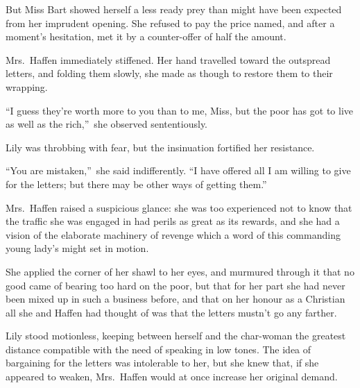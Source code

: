 \documentclass[12pt,a4paper]{book}
\begin{document}
But Miss Bart showed herself a less ready prey than might have
been expected from her imprudent opening. She refused to pay the
price named, and after a moment's hesitation, met it by a
counter-offer of half the amount.





Mrs.\ Haffen immediately stiffened. Her hand travelled toward the
outspread letters, and folding them slowly, she made as though to
restore them to their wrapping.





``I guess they're worth more to you than to me, Miss, but the poor
has got to live as well as the rich,''\ she observed sententiously.






Lily was throbbing with fear, but the insinuation fortified her
resistance.





``You are mistaken,''\ she said indifferently. ``I have offered all I
am willing to give for the letters; but there may be other ways
of getting them.''





Mrs.\ Haffen raised a suspicious glance: she was too experienced
not to know that the traffic she was engaged in had perils as
great as its rewards, and she had a vision of the elaborate
machinery of revenge which a word of this commanding young lady's
might set in motion.





She applied the corner of her shawl to her eyes, and murmured
through it that no good came of bearing too hard on the poor, but
that for her part she had never been mixed up in such a business
before, and that on her honour as a Christian all she and Haffen
had thought of was that the letters mustn't go any farther.





Lily stood motionless, keeping between herself and the char-woman
the greatest distance compatible with the need of speaking in low
tones. The idea of bargaining for the letters was intolerable to
her, but she knew that, if she appeared to weaken, Mrs.\ Haffen
would at once increase her original demand.
\end{document}
